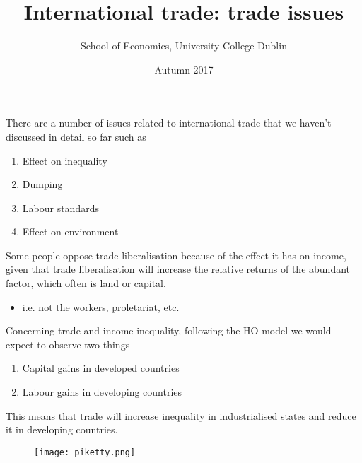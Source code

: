 \documentclass{beamer}
\title{International trade: trade issues}
\author{School of Economics, University College Dublin}
\date{Autumn 2017}
\begin{document}
\begin{frame}
\titlepage  
\end{frame}

\begin{frame}
  There are a number of issues related to international trade that we haven't discussed in detail so far such as
  \begin{enumerate}
    \item Effect on inequality
    \item Dumping    
    \item Labour standards
    \item Effect on environment
  \end{enumerate}  
\end{frame}


\begin{frame}
  Some people oppose trade liberalisation because of the effect it has on income, given that trade liberalisation will increase the relative returns of the abundant factor, which often is land or capital.
  \begin{itemize}
    \item i.e. not the workers, proletariat, etc.
  \end{itemize}  
\end{frame}

\begin{frame}
Concerning trade and income inequality, following the HO-model we would expect to observe two things
\begin{enumerate}
  \item Capital gains in developed countries
  \item Labour gains in developing countries
\end{enumerate}
\medskip
This means that trade will increase inequality in industrialised states and reduce it in developing countries.
\end{frame}

\begin{frame}
  \begin{figure}
    \texttt{[image: piketty.png]}
  \end{figure}
\end{frame}
\end{document}
